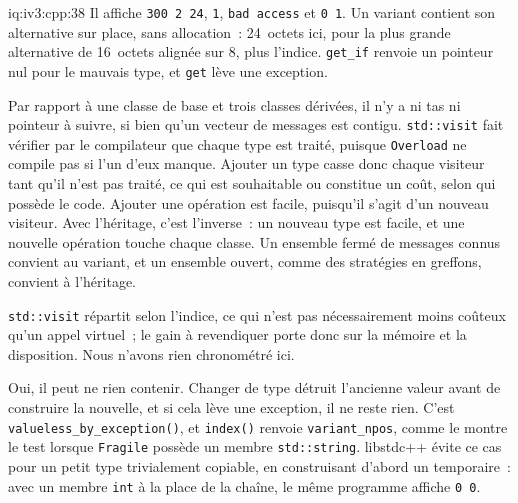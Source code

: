 \begin{solution}{iq:iv3:cpp:38}
Il affiche \texttt{300 2 24}, \texttt{1}, \texttt{bad access} et \texttt{0 1}. Un variant contient son alternative sur place, sans allocation~: 24~octets ici, pour la plus grande alternative de 16~octets alignée sur 8, plus l'indice. \texttt{get\_if} renvoie un pointeur nul pour le mauvais type, et \texttt{get} lève une exception.

Par rapport à une classe de base et trois classes dérivées, il n'y a ni tas ni pointeur à suivre, si bien qu'un vecteur de messages est contigu. \texttt{std::visit} fait vérifier par le compilateur que chaque type est traité, puisque \texttt{Overload} ne compile pas si l'un d'eux manque. Ajouter un type casse donc chaque visiteur tant qu'il n'est pas traité, ce qui est souhaitable ou constitue un coût, selon qui possède le code. Ajouter une opération est facile, puisqu'il s'agit d'un nouveau visiteur. Avec l'héritage, c'est l'inverse~: un nouveau type est facile, et une nouvelle opération touche chaque classe. Un ensemble fermé de messages connus convient au variant, et un ensemble ouvert, comme des stratégies en greffons, convient à l'héritage.

\texttt{std::visit} répartit selon l'indice, ce qui n'est pas nécessairement moins coûteux qu'un appel virtuel~; le gain à revendiquer porte donc sur la mémoire et la disposition. Nous n'avons rien chronométré ici.

Oui, il peut ne rien contenir. Changer de type détruit l'ancienne valeur avant de construire la nouvelle, et si cela lève une exception, il ne reste rien. C'est \texttt{valueless\_by\_exception()}, et \texttt{index()} renvoie \texttt{variant\_npos}, comme le montre le test lorsque \texttt{Fragile} possède un membre \texttt{std::string}. libstdc++ évite ce cas pour un petit type trivialement copiable, en construisant d'abord un temporaire~: avec un membre \texttt{int} à la place de la chaîne, le même programme affiche \texttt{0 0}.

\end{solution}

